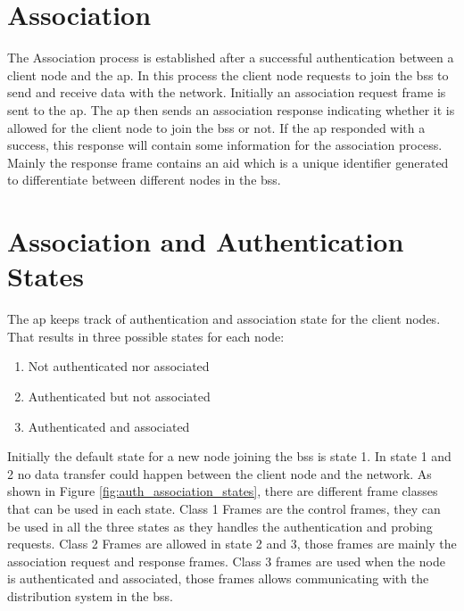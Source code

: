 \section{Association}
\label{sec:association}
The Association process is established after a successful authentication between a client node and the \ac{ap}.
In this process the client node requests to join the \ac{bss} to send and receive data with the network. Initially
an association request frame is sent to the \ac{ap}. The \ac{ap} then sends an association response indicating whether
it is allowed for the client node to join the \ac{bss} or not. If the \ac{ap} responded with a success, this response
will contain some information for the association process. Mainly the response frame contains an \ac{aid} which is a unique
identifier generated to differentiate between different nodes in the \ac{bss}.\cite{cwsp-205_2016}


\section{Association and Authentication States}
\label{sec:association_authentication_states}
The \ac{ap} keeps track of authentication and association state for the client nodes. That results in three
possible states for each node:
\begin{enumerate}
  \item Not authenticated nor associated
  \item Authenticated but not associated
  \item Authenticated and associated
\end{enumerate}

Initially the default state for a new node joining the \ac{bss} is state 1. In state 1 and 2 no data transfer could
happen between the client node and the network. As shown in Figure \ref{fig:auth_association_states},
there are different frame classes that can be used in each state. Class 1 Frames are the control frames, they can be used
in all the three states as they handles the authentication and probing requests. Class 2 Frames are allowed in state 2 and 3,
those frames are mainly the association request and response frames. Class 3 frames are used when the node is authenticated
and associated, those frames allows communicating with the distribution system in the \ac{bss}.\cite{gast_2005}


